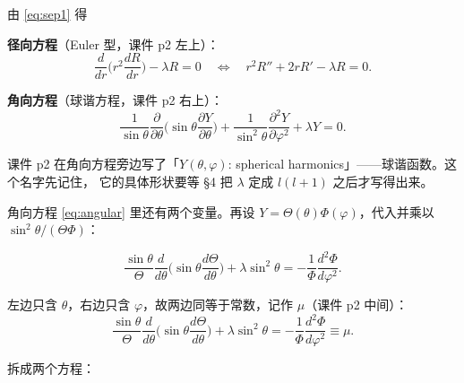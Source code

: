 
由 \eqref{eq:sep1} 得

\textbf{径向方程}（Euler 型，课件 p2 左上）：
\begin{equation}
\frac{d}{dr}\Big(r^2\frac{dR}{dr}\Big)-\lambda R=0
\quad\Longleftrightarrow\quad
r^2R''+2rR'-\lambda R=0 .
\label{eq:radial}
\end{equation}

\textbf{角向方程}（球谐方程，课件 p2 右上）：
\begin{equation}
\frac{1}{\sin\theta}\frac{\partial}{\partial\theta}\Big(\sin\theta\frac{\partial Y}{\partial\theta}\Big)
+\frac{1}{\sin^2\theta}\frac{\partial^2Y}{\partial\varphi^2}+\lambda Y=0 .
\label{eq:angular}
\end{equation}

课件 p2 在角向方程旁边写了「$Y(\theta,\varphi)$: spherical harmonics」——球谐函数。这个名字先记住，
它的具体形状要等 \S4 把 $\lambda$ 定成 $l(l+1)$ 之后才写得出来。


\label{sec:s3}


角向方程 \eqref{eq:angular} 里还有两个变量。再设 $Y=\Theta(\theta)\Phi(\varphi)$，代入并乘以 $\sin^2\theta/(\Theta\Phi)$：

\[
\frac{\sin\theta}{\Theta}\frac{d}{d\theta}\Big(\sin\theta\frac{d\Theta}{d\theta}\Big)+\lambda\sin^2\theta
=-\frac{1}{\Phi}\frac{d^2\Phi}{d\varphi^2}.
\]

左边只含 $\theta$，右边只含 $\varphi$，故两边同等于常数，记作 $\mu$（课件 p2 中间）：
\begin{equation}
\frac{\sin\theta}{\Theta}\frac{d}{d\theta}\Big(\sin\theta\frac{d\Theta}{d\theta}\Big)+\lambda\sin^2\theta
=-\frac{1}{\Phi}\frac{d^2\Phi}{d\varphi^2}\equiv\mu .
\label{eq:sep2}
\end{equation}

拆成两个方程：

